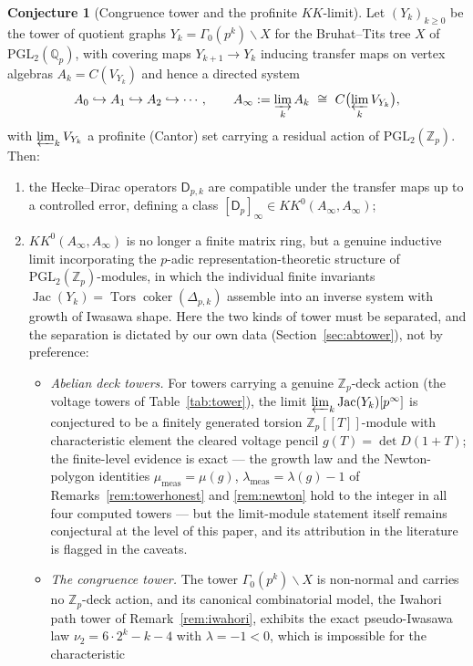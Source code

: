 \documentclass[11pt]{amsart}
\numberwithin{equation}{section}
\theoremstyle{definition}
\newtheorem{conjecture}[theorem]{Conjecture}
\theoremstyle{remark}
\newcommand{\Z}{\mathbb{Z}}
\newcommand{\Q}{\mathbb{Q}}
\newcommand{\Tors}{\operatorname{Tors}}
\newcommand{\coker}{\operatorname{coker}}
\newcommand{\Jac}{\operatorname{Jac}}
\newcommand{\PGL}{\mathrm{PGL}}
\begin{document}
\begin{conjecture}[Congruence tower and the profinite $KK$-limit]\label{conj:tower}
Let $(Y_k)_{k\ge0}$ be the tower of quotient graphs $Y_k=\Gamma_0(p^k)\backslash X$ for
the Bruhat--Tits tree $X$ of $\PGL_2(\Q_p)$, with covering maps $Y_{k+1}\to Y_k$ inducing
transfer maps on vertex algebras $A_k=C(V_{Y_k})$ and hence a directed system
\[
A_0\hookrightarrow A_1\hookrightarrow A_2\hookrightarrow\cdots,\qquad
A_\infty:=\varinjlim_kA_k\ \cong\ C\bigl(\varprojlim_kV_{Y_k}\bigr),
\]
with $\varprojlim_kV_{Y_k}$ a profinite (Cantor) set carrying a residual action of
$\PGL_2(\Z_p)$. Then:
\begin{enumerate}
\item[(i)] the Hecke--Dirac operators $\mathsf D_{p,k}$ are compatible under the transfer
maps up to a controlled error, defining a class
$[\mathsf D_p]_\infty\in KK^0(A_\infty,A_\infty)$;
\item[(ii)] $KK^0(A_\infty,A_\infty)$ is no longer a finite matrix ring, but a genuine
inductive limit incorporating the $p$-adic representation-theoretic structure of
$\PGL_2(\Z_p)$-modules, in which the individual finite invariants
$\Jac(Y_k)=\Tors\coker(\Delta_{p,k})$ assemble into an inverse system with growth of
Iwasawa shape. Here the two kinds of tower must be separated, and the separation is
dictated by our own data (Section~\ref{sec:abtower}), not by preference:
\begin{itemize}
\item[(ii-a)] \emph{Abelian deck towers.} For towers carrying a genuine
$\Z_p$-deck action (the voltage towers of Table~\ref{tab:tower}), the limit
$\varprojlim_k\Jac(Y_k)[p^\infty]$ is conjectured to be a finitely generated torsion
$\Z_p[[T]]$-module with characteristic element the cleared voltage pencil
$g(T)=\det D(1+T)$; the finite-level evidence is exact --- the growth law and the
Newton-polygon identities $\mu_{\mathrm{meas}}=\mu(g)$,
$\lambda_{\mathrm{meas}}=\lambda(g)-1$ of Remarks~\ref{rem:towerhonest} and
\ref{rem:newton} hold to the integer in all four computed towers --- but the
limit-module statement itself remains conjectural at the level of this paper, and its
attribution in the literature is flagged in the caveats.
\item[(ii-b)] \emph{The congruence tower.} The tower $\Gamma_0(p^k)\backslash X$ is
non-normal and carries no $\Z_p$-deck action, and its canonical combinatorial model, the
Iwahori path tower of Remark~\ref{rem:iwahori}, exhibits the exact pseudo-Iwasawa law
$\nu_2=6\cdot2^k-k-4$ with $\lambda=-1<0$, which is impossible for the characteristic

\end{itemize}
\end{enumerate}
\end{conjecture}
\end{document}
